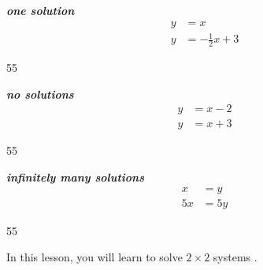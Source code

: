 \begin{minipage}[t]{0.3\textwidth}
    \begin{center}
        {\bfseries\itshape one solution}
        \begin{align*} y &= x \\ y &= -\frac{1}{2}x + 3 \end{align*}
        \begin{myTikzpictureGrid}{0.25} {5}{5}
        \end{myTikzpictureGrid}
    \end{center}
\end{minipage}
%
\hfil 
%
\begin{minipage}[t]{0.3\textwidth}
    \begin{center}
        {\bfseries\itshape no solutions}
        \begin{align*} y &= x - 2 \\ y &= x+3 \end{align*} 
        \begin{myTikzpictureGrid}{0.25} {5}{5}
        \end{myTikzpictureGrid}
    \end{center}
\end{minipage}
%
\hfil 
%
\begin{minipage}[t]{0.3\textwidth}
    \begin{center}
        {\bfseries\itshape infinitely many solutions}
        \begin{align*} x &= y \\ 5x &= 5y \end{align*}
        \begin{myTikzpictureGrid}{0.25} {5}{5}
        \end{myTikzpictureGrid}
    \end{center}
\end{minipage}

\vfil

\begin{tcolorbox}[center,width=6in]
    In this lesson,
    you will learn to solve $2\times2$ systems .
\end{tcolorbox}
